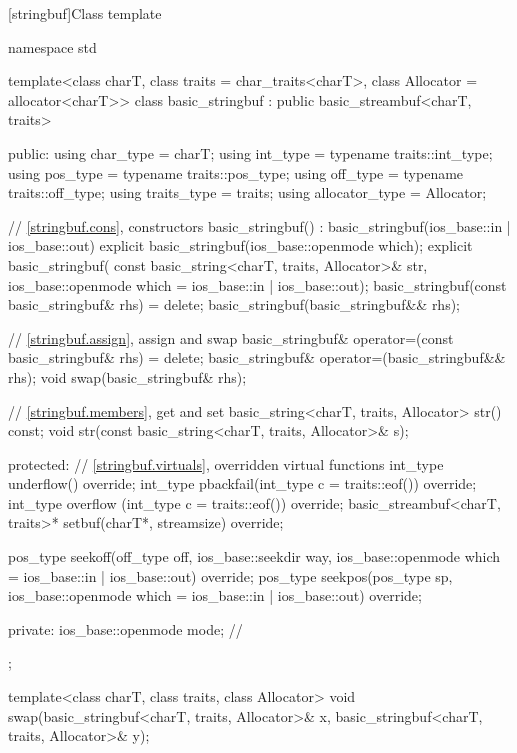 [stringbuf]{Class template }
%
\begin{codeblock}
namespace std {
  template<class charT, class traits = char_traits<charT>,
           class Allocator = allocator<charT>>
  class basic_stringbuf : public basic_streambuf<charT, traits> {
  public:
    using char_type      = charT;
    using int_type       = typename traits::int_type;
    using pos_type       = typename traits::pos_type;
    using off_type       = typename traits::off_type;
    using traits_type    = traits;
    using allocator_type = Allocator;

    // \ref{stringbuf.cons}, constructors
    basic_stringbuf() : basic_stringbuf(ios_base::in | ios_base::out) {}
    explicit basic_stringbuf(ios_base::openmode which);
    explicit basic_stringbuf(
      const basic_string<charT, traits, Allocator>& str,
      ios_base::openmode which = ios_base::in | ios_base::out);
    basic_stringbuf(const basic_stringbuf& rhs) = delete;
    basic_stringbuf(basic_stringbuf&& rhs);

    // \ref{stringbuf.assign}, assign and swap
    basic_stringbuf& operator=(const basic_stringbuf& rhs) = delete;
    basic_stringbuf& operator=(basic_stringbuf&& rhs);
    void swap(basic_stringbuf& rhs);

    // \ref{stringbuf.members}, get and set
    basic_string<charT, traits, Allocator> str() const;
    void str(const basic_string<charT, traits, Allocator>& s);

  protected:
    // \ref{stringbuf.virtuals}, overridden virtual functions
    int_type underflow() override;
    int_type pbackfail(int_type c = traits::eof()) override;
    int_type overflow (int_type c = traits::eof()) override;
    basic_streambuf<charT, traits>* setbuf(charT*, streamsize) override;

    pos_type seekoff(off_type off, ios_base::seekdir way,
                     ios_base::openmode which
                      = ios_base::in | ios_base::out) override;
    pos_type seekpos(pos_type sp,
                     ios_base::openmode which
                      = ios_base::in | ios_base::out) override;

  private:
    ios_base::openmode mode;  // \expos
  };

  template<class charT, class traits, class Allocator>
    void swap(basic_stringbuf<charT, traits, Allocator>& x,
              basic_stringbuf<charT, traits, Allocator>& y);
}
\end{codeblock}

